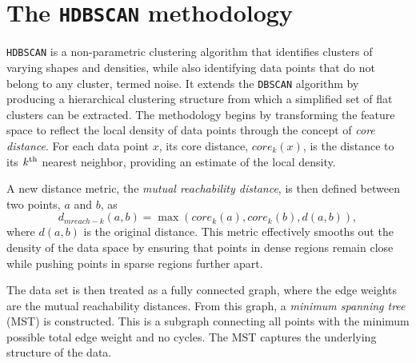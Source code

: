 \begin{table}
    \caption{Merger events contributing at least 1\% of the accreted stars bound to the main halo at $z=0$ for the galaxies in the sample.  From the leftmost to the rightmost, the columns describe: (i) the index of the progenitor in the merger tree of the galaxy; (ii) the lookback infall time, i.e., the first time the progenitor crossed $R_{200}$ of its host; (iii) the stellar mass of the progenitor at the time of infall; (iv) the fraction of star particles bound to the main halo at $z=0$ which were accreted from the progenitor; (v) the present-day configuration of the progenitor debris as classified by \citet{Riley2025}.}
    \label{tab:galaxy_sample}
\end{table}



\section{The \texttt{HDBSCAN} methodology}
\label{sec:hdbscan_algorithm}

\texttt{HDBSCAN} \citep{Campello2013} is a non-parametric clustering algorithm that identifies clusters of varying shapes and densities, while also identifying data points that do not belong to any cluster, termed noise. It extends the \texttt{DBSCAN} algorithm by producing a hierarchical clustering structure from which a simplified set of flat clusters can be extracted. The methodology begins by transforming the feature space to reflect the local density of data points through the concept of \textit{core distance}. For each data point $x$, its core distance, $core_k(x)$, is the distance to its $k^{\rm th}$ nearest neighbor, providing an estimate of the local density.

A new distance metric, the \textit{mutual reachability distance},  is then defined between two points, $a$ and $b$, as
\begin{equation*}
   d_{mreach-k}(a,b) = \max(core_k(a), core_k(b), d(a,b)), 
\end{equation*}
where $d(a,b)$ is the original distance. This metric effectively smooths out the density of the data space by ensuring that points in dense regions remain close while pushing points in sparse regions further apart.

The data set is then treated as a fully connected graph, where the edge weights are the mutual reachability distances. From this graph, a \textit{minimum spanning tree} (MST) is constructed. This is a subgraph connecting all points with the minimum possible total edge weight and no cycles. The MST captures the underlying structure of the data.


